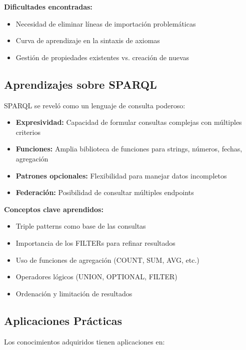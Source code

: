 \documentclass[12pt,a4paper]{article}
\begin{document}
\textbf{Dificultades encontradas:}
\begin{itemize}
    \item Necesidad de eliminar líneas de importación problemáticas
    \item Curva de aprendizaje en la sintaxis de axiomas
    \item Gestión de propiedades existentes vs. creación de nuevas
\end{itemize}

\subsection{Aprendizajes sobre SPARQL}

SPARQL se reveló como un lenguaje de consulta poderoso:

\begin{itemize}
    \item \textbf{Expresividad:} Capacidad de formular consultas complejas con múltiples criterios
    \item \textbf{Funciones:} Amplia biblioteca de funciones para strings, números, fechas, agregación
    \item \textbf{Patrones opcionales:} Flexibilidad para manejar datos incompletos
    \item \textbf{Federación:} Posibilidad de consultar múltiples endpoints
\end{itemize}

\textbf{Conceptos clave aprendidos:}
\begin{itemize}
    \item Triple patterns como base de las consultas
    \item Importancia de los FILTERs para refinar resultados
    \item Uso de funciones de agregación (COUNT, SUM, AVG, etc.)
    \item Operadores lógicos (UNION, OPTIONAL, FILTER)
    \item Ordenación y limitación de resultados
\end{itemize}

\subsection{Aplicaciones Prácticas}

Los conocimientos adquiridos tienen aplicaciones en:
\end{document}
